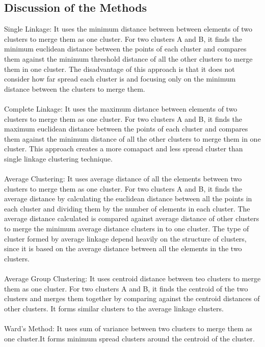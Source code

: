 \documentclass[12pt]{report}
\begin{document}
\subsection{Discussion of the Methods}
Single Linkage: It uses the minimum distance between between elements of two clusters to merge them as one cluster. For two clusters A and B, it finds the minimum euclidean distance between the points of each cluster and compares them against the minimum threshold distance of all the other clusters to merge them in one cluster. The disadvantage of this approach is that it does not consider how far spread each cluster is and focusing only on the minimum distance between the clusters to merge them.\\ \\
Complete Linkage: It uses the maximum distance between elements of two clusters to merge them as one cluster. For two clusters A and B, it finds the maximum euclidean distance between the points of each cluster and compares them against the minimum distance of all the other clusters to merge them in one cluster. This approach creates a more comapact and less spread cluster than single linkage clustering technique.\\ \\
Average Clustering: It uses average distance of all the elements between two clusters to merge them as one cluster. For two clusters A and B, it finds the average distance by calculating the euclidean distance between all the points in each cluster and dividing them by the number of elements  in each cluster. The average distance calculated is compared against average distance of other clusters to merge the minimum average distance clusters in to one cluster. The type of cluster formed by average linkage depend heavily on the structure of clusters, since it is based on the average distance between all the elements in the two clusters. \\ \\
Average Group Clustering: It uses centroid distance between teo clusters to merge them as one cluster. For two clusters A and B, it finds the centroid of the two clusters and merges them together by comparing against the centroid distances of other clusters. It forms similar clusters to the average linkage clusters.\\ \\
Ward's Method: It uses sum of variance between two clusters to merge them as one cluster.It forms minimum spread clusters around the centroid of the cluster.\\


\end{document}
